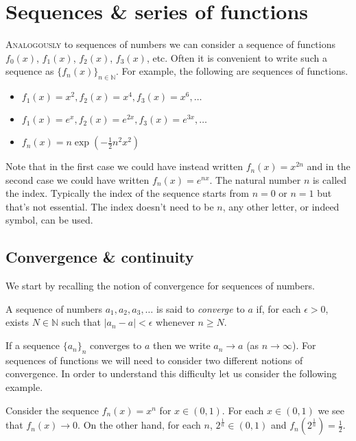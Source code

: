 \chapter{Sequences \& series of functions}
\bookletstart

\lettrine{A}{nalogously} to sequences of numbers we can consider a sequence of functions \(f_0(x)\), \(f_1(x)\), \(f_2(x)\), \(f_3(x)\), etc.
Often it is convenient to write such a sequence as \({\{ f_n(x)\}}_{n\in \mathbb{N}}\).
For example, the following are sequences of functions.
\begin{itemize}
  \item \(f_1(x) = x^2, f_2(x)=x^4, f_3(x)=x^6,\ldots \)
  \item \(f_1(x) = e^x, f_2(x)=e^{2x}, f_3(x)=e^{3x},\ldots \)
  \item \(f_n(x) = n \exp \left( - \frac{1}{2}n^2 x^2 \right)\)
\end{itemize}

Note that in the first case we could have instead written \(f_n(x) = x^{2n}\) and in the second case we could have written  \(f_n(x) = e^{nx}\).
The natural number \(n\) is called the index.
Typically the index of the sequence starts from \(n=0\) or \(n=1\) but that's not essential.
The index doesn't need to be \(n\), any other letter, or indeed symbol, can be used.


\section{Convergence \& continuity}

We start by recalling the notion of convergence for sequences of numbers.

\begin{definition}
  A sequence of numbers  \(a_1, a_2, a_3,\ldots \) is said to \emph{converge} to \(a\) if, for each \(\epsilon>0\), exists \(N\in \mathbb{N}\) such that \(|a_n - a| < \epsilon\) whenever \(n\geq N\).
\end{definition}
%
\noindent
If a sequence \({\{a_n\}}_{n}\) converges to \(a\) then we write \(a_n \to a\) (as \(n\to \infty\)).
For sequences of functions we will need to consider two different notions of convergence.
In order to understand this difficulty let us consider the following example.

\begin{example*}
  Consider the sequence \(f_n(x) = x^n\) for \(x\in (0,1)\).
  For each \(x\in (0,1)\) we see that \(f_n(x) \to 0\).
  On the other hand, for each \(n\), \(2^{\frac{1}{n}}\in (0,1)\) and \(f_n(2^{\frac{1}{n}}) = \frac{1}{2}\).
\end{example*}


